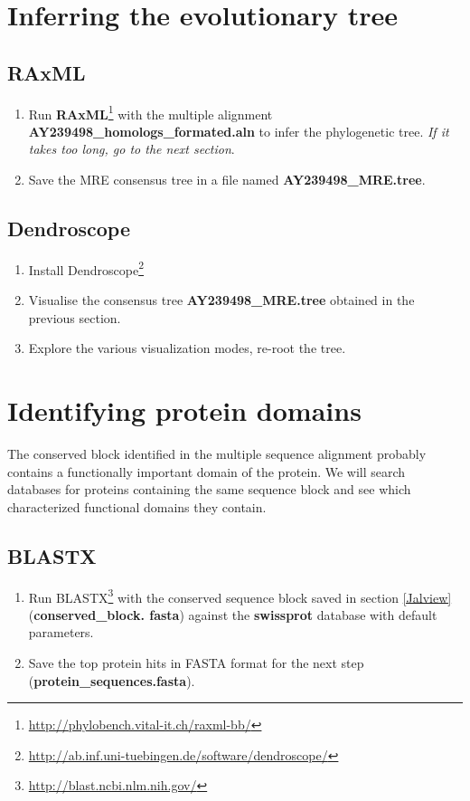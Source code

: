 \documentclass[a4paper,11pt]{article}
\begin{document}
\section{Inferring the evolutionary tree}
\subsection{RAxML}
\begin{enumerate}
\item Run \textbf{RAxML}\footnote{\url{http://phylobench.vital-it.ch/raxml-bb/}} with
  the multiple alignment \textbf{AY239498\_homologs\_formated.aln} to
  infer the phylogenetic tree. \textit{If it takes too
  long, go to the next section}.
\item Save the MRE consensus tree in a file named
  \textbf{AY239498\_MRE.tree}.
\end{enumerate}


\subsection{Dendroscope}
\begin{enumerate} 
\item Install Dendroscope\footnote{\url{http://ab.inf.uni-tuebingen.de/software/dendroscope/}}
\item Visualise the consensus tree
  \textbf{AY239498\_MRE.tree} obtained
  in the previous section.
\item Explore the various visualization modes, re-root the tree.
\end{enumerate}

\section{Identifying protein domains}

The conserved block identified in the multiple sequence alignment
probably contains a functionally important domain of the protein. We will search
databases for proteins containing the same sequence block and see
which characterized functional domains they contain.

\subsection{BLASTX}

\begin{enumerate}
\item Run BLASTX\footnote{\url{http://blast.ncbi.nlm.nih.gov/}} with
  the conserved sequence block saved in section \ref{Jalview}
  (\textbf{conserved\_block. fasta})
  against the \textbf{swissprot} database with default parameters. 
\item Save the top protein hits in FASTA format for the next step (\textbf{protein\_sequences.fasta}).
\end{enumerate}
\end{document}
